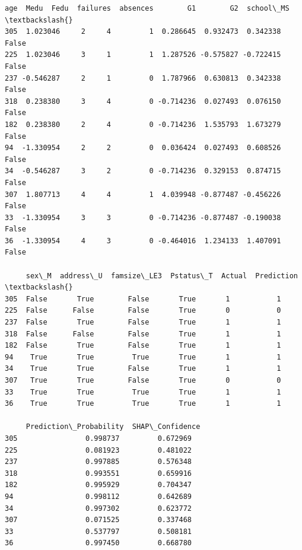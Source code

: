 \documentclass[9pt]{article}
\makeatletter
\newcommand{\boxspacing}{\kern\kvtcb@left@rule\kern\kvtcb@boxsep}
\newcommand{\prompt}[4]{
        {\ttfamily\llap{{\color{#2}[#3]:\hspace{3pt}#4}}\vspace{-\baselineskip}}
    }
\makeatother
\begin{document}
            \begin{tcolorbox}[breakable, size=fbox, boxrule=.5pt, pad at break*=1mm, opacityfill=0]
\prompt{Out}{outcolor}{29}{\boxspacing}
\begin{Verbatim}[commandchars=\\\{\}]
          age  Medu  Fedu  failures  absences        G1        G2  school\_MS  \textbackslash{}
305  1.023046     2     4         1  0.286645  0.932473  0.342338      False
225  1.023046     3     1         1  1.287526 -0.575827 -0.722415      False
237 -0.546287     2     1         0  1.787966  0.630813  0.342338      False
318  0.238380     3     4         0 -0.714236  0.027493  0.076150      False
182  0.238380     2     4         0 -0.714236  1.535793  1.673279      False
94  -1.330954     2     2         0  0.036424  0.027493  0.608526      False
34  -0.546287     3     2         0 -0.714236  0.329153  0.874715      False
307  1.807713     4     4         1  4.039948 -0.877487 -0.456226      False
33  -1.330954     3     3         0 -0.714236 -0.877487 -0.190038      False
36  -1.330954     4     3         0 -0.464016  1.234133  1.407091      False

     sex\_M  address\_U  famsize\_LE3  Pstatus\_T  Actual  Prediction  \textbackslash{}
305  False       True        False       True       1           1
225  False      False        False       True       0           0
237  False       True        False       True       1           1
318  False      False        False       True       1           1
182  False       True        False       True       1           1
94    True       True         True       True       1           1
34    True       True        False       True       1           1
307   True       True        False       True       0           0
33    True       True         True       True       1           1
36    True       True         True       True       1           1

     Prediction\_Probability  SHAP\_Confidence
305                0.998737         0.672969
225                0.081923         0.481022
237                0.997885         0.576348
318                0.993551         0.659916
182                0.995929         0.704347
94                 0.998112         0.642689
34                 0.997302         0.623772
307                0.071525         0.337468
33                 0.537797         0.508181
36                 0.997450         0.668780
\end{Verbatim}
\end{tcolorbox}
        
\end{document}
